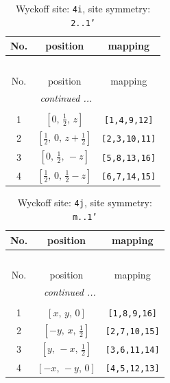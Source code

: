 \documentclass[fleqn,8pt]{jsarticle}
\begin{document}
\renewcommand{\arraystretch}{1.2}
\begin{longtable}{ccc}
\caption{Wyckoff site: {\tt 4i}, site symmetry: {\tt 2..1'}}
 \\
 \hline \hline
No. & position & mapping \\ \hline \endfirsthead

\multicolumn{2}{l}{\tablename\ \thetable{}} \\
 \hline \hline
No. & position & mapping \\ \hline \endhead

 \hline \hline
\multicolumn{2}{r}{\footnotesize\it continued ...} \\ \endfoot

 \hline \hline
\multicolumn{2}{r}{} \\ \endlastfoot

1 & $\left[ 0,\, \frac{1}{2},\, z \right]$ & {\tt [1,4,9,12]} \\ \hline
2 & $\left[ \frac{1}{2},\, 0,\, z + \frac{1}{2} \right]$ & {\tt [2,3,10,11]} \\ \hline
3 & $\left[ 0,\, \frac{1}{2},\, - z \right]$ & {\tt [5,8,13,16]} \\ \hline
4 & $\left[ \frac{1}{2},\, 0,\, \frac{1}{2} - z \right]$ & {\tt [6,7,14,15]} \\
\end{longtable}
\renewcommand{\arraystretch}{1.2}
\begin{longtable}{ccc}
\caption{Wyckoff site: {\tt 4j}, site symmetry: {\tt m..1'}}
 \\
 \hline \hline
No. & position & mapping \\ \hline \endfirsthead

\multicolumn{2}{l}{\tablename\ \thetable{}} \\
 \hline \hline
No. & position & mapping \\ \hline \endhead

 \hline \hline
\multicolumn{2}{r}{\footnotesize\it continued ...} \\ \endfoot

 \hline \hline
\multicolumn{2}{r}{} \\ \endlastfoot

1 & $\left[ x,\, y,\, 0 \right]$ & {\tt [1,8,9,16]} \\ \hline
2 & $\left[ - y,\, x,\, \frac{1}{2} \right]$ & {\tt [2,7,10,15]} \\ \hline
3 & $\left[ y,\, - x,\, \frac{1}{2} \right]$ & {\tt [3,6,11,14]} \\ \hline
4 & $\left[ - x,\, - y,\, 0 \right]$ & {\tt [4,5,12,13]} \\
\end{longtable}
\end{document}
